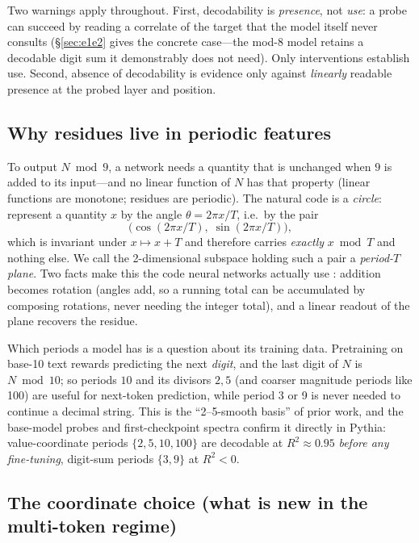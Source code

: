\documentclass{article} %
\begin{document}
Two warnings apply throughout. First, decodability is \emph{presence}, not \emph{use}: a probe can succeed by reading a correlate of the target that the model itself never consults (\S\ref{sec:e1e2} gives the concrete case---the mod-8 model retains a decodable digit sum it demonstrably does not need). Only interventions establish use. Second, absence of decodability is evidence only against \emph{linearly} readable presence at the probed layer and position.

\subsection{Why residues live in periodic features}
\label{app:bg-fourier}

To output $N \bmod 9$, a network needs a quantity that is unchanged when $9$ is added to its input---and no linear function of $N$ has that property (linear functions are monotone; residues are periodic). The natural code is a \emph{circle}: represent a quantity $x$ by the angle $\theta = 2\pi x / T$, i.e.\ by the pair
\[
\big(\cos(2\pi x / T),\; \sin(2\pi x / T)\big),
\]
which is invariant under $x \mapsto x + T$ and therefore carries \emph{exactly} $x \bmod T$ and nothing else. We call the 2-dimensional subspace holding such a pair a \emph{period-$T$ plane}. Two facts make this the code neural networks actually use \citep{nanda2023progress,zhou2024fourier,kantamneni2025trig,subspaces2025addition}: addition becomes rotation (angles add, so a running total can be accumulated by composing rotations, never needing the integer total), and a linear readout of the plane recovers the residue.

Which periods a model has is a question about its training data. Pretraining on base-10 text rewards predicting the next \emph{digit}, and the last digit of $N$ is $N \bmod 10$; so periods $10$ and its divisors $2, 5$ (and coarser magnitude periods like 100) are useful for next-token prediction, while period 3 or 9 is never needed to continue a decimal string. This is the ``2--5-smooth basis'' of prior work, and the base-model probes and first-checkpoint spectra confirm it directly in Pythia: value-coordinate periods $\{2,5,10,100\}$ are decodable at $R^2 \approx 0.95$ \emph{before any fine-tuning}, digit-sum periods $\{3, 9\}$ at $R^2 < 0$.

\subsection{The coordinate choice (what is new in the multi-token regime)}
\label{app:bg-coord}
\end{document}
